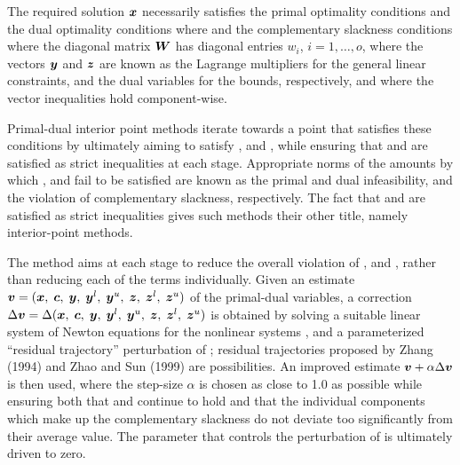 \documentclass{galahad}
\begin{document}

\galmethod
The required solution ${\bm{x}}$ necessarily satisfies
the primal optimality conditions
and
the dual optimality conditions
where
and the complementary slackness conditions
where the diagonal matrix ${\bm{W}}$ has diagonal entries $w_i$,
$i = 1, \ldots , o$, where the vectors ${\bm{y}}$ and ${\bm{z}}$ are
known as the Lagrange multipliers for
the general linear constraints, and the dual variables for the bounds,
respectively, and where the vector inequalities hold component-wise.

Primal-dual interior point methods iterate towards a point
that satisfies these conditions by ultimately aiming to satisfy
,  and , while ensuring that
 and  are
satisfied as strict inequalities at each stage.
Appropriate norms of the amounts by
which ,  and  fail to be satisfied are known as the
primal and dual infeasibility, and the violation of complementary slackness,
respectively. The fact that  and  are satisfied as strict
inequalities gives such methods their other title, namely
interior-point methods.

The method aims at each stage to reduce the
overall violation of ,  and ,
rather than reducing each of the terms individually. Given an estimate
${\bm{v}} = ({\bm{x}}, \; {\bm{c}}, \; {\bm{y}}, \; {\bm{y}}^{l}, \;
{\bm{y}}^{u}, \; {\bm{z}}, \; {\bm{z}}^{l}, \; {\bm{z}}^{u})$
of the primal-dual variables, a correction
$\Delta {\bm{v}} = \Delta ({\bm{x}}, \; {\bm{c}}, \; {\bm{y}}, \; {\bm{y}}^{l},
 \; {\bm{y}}^{u} ,\;{\bm{z}},\;{\bm{z}}^{l} ,\;{\bm{z}}^{u} )$
is obtained by solving a suitable linear system of Newton equations for the
nonlinear systems ,  and a parameterized ``residual
trajectory'' perturbation of ; residual trajectories
proposed by Zhang (1994) and Zhao and Sun (1999) are possibilities.
An improved estimate ${\bm{v}} + \alpha \Delta {\bm{v}}$
is then used, where the step-size $\alpha$
is chosen as close to 1.0 as possible while ensuring both that
 and  continue to hold and that the individual components
which make up the complementary slackness
 do not deviate too significantly
from their average value. The parameter that controls the perturbation
of  is ultimately driven to zero.
\end{document}
